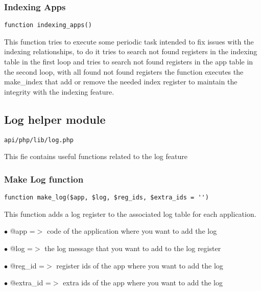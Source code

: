\documentclass[a4paper]{article}
\begin{document}
\hypertarget{toc487}{}
\subsubsection{Indexing Apps}

\begin{lstlisting}
function indexing_apps()
\end{lstlisting}

This function tries to execute some periodic task intended to fix issues with
the indexing relationships, to do it tries to search not found registers in
the indexing table in the first loop and tries to search not found registers
in the app table in the second loop, with all found not found registers the
function executes the make\_index that add or remove the needed index register
to maintain the integrity with the indexing feature.

\hypertarget{toc488}{}
\subsection{Log helper module}

\begin{lstlisting}
api/php/lib/log.php
\end{lstlisting}

This fie contains useful functions related to the log feature

\hypertarget{toc489}{}
\subsubsection{Make Log function}

\begin{lstlisting}
function make_log($app, $log, $reg_ids, $extra_ids = '')
\end{lstlisting}

This function adds a log register to the associated log table for each
application.

\begin{compactitem}
\item[\color{myblue}$\bullet$] @app      =$>$ code of the application where you want to add the log
\item[\color{myblue}$\bullet$] @log      =$>$ the log message that you want to add to the log register
\item[\color{myblue}$\bullet$] @reg\_id   =$>$ register ids of the app where you want to add the log
\item[\color{myblue}$\bullet$] @extra\_id =$>$ extra ids of the app where you want to add the log
\end{compactitem}
\end{document}

